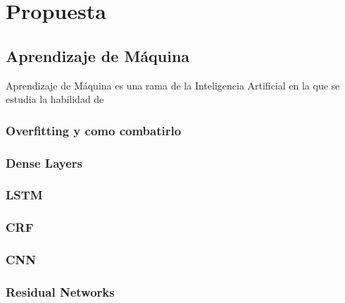 \chapter{Propuesta}\label{chapter:proposal}



\section{Aprendizaje de Máquina}

Aprendizaje de Máquina es una rama de la Inteligencia Artificial en la que se estudia la habilidad de 

\subsection{Overfitting y como combatirlo}

\subsection{Dense Layers}

\subsection{LSTM}

\subsection{CRF}

\subsection{CNN}

\subsection{Residual Networks}

